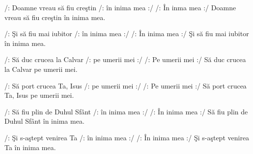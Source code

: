 
\beginverse
/: Doamne vreau să fiu creştin /: în inima mea :/
/: În inma mea :/ 
Doamne vreau să fiu creştin în inima mea. 
\endverse

\beginverse
/: Şi să fiu mai iubitor /: în inima mea :/
/: În inima mea :/
Şi să fiu mai iubitor în inima mea. 
\endverse

\beginverse
/: Să duc crucea la Calvar /: pe umerii mei :/
/: Pe umerii mei :/
Să duc crucea la Calvar pe umerii mei.
\endverse

\beginverse
/: Să port crucea Ta, Isus /: pe umerii mei :/
/: Pe umerii mei :/
Să port crucea Ta, Isus pe umerii mei.
\endverse

\beginverse
/: Să fiu plin de Duhul Sfânt /: în inima mea :/
/: În inima mea :/
Să fiu plin de Duhul Sfânt în inima mea.
\endverse

\beginverse
/: Şi s-aştept venirea Ta /: în inima mea :/
/: În inima mea :/
Şi s-aştept venirea Ta în inima mea.
\endverse

\endsong
